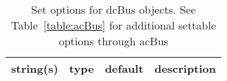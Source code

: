 \begin{table}[ht]
\centering
\begin{tabular}{p{5cm} c c p{7cm}}
\hline
string(s) & type & default & description \\
\hline
\hline
\end{tabular}
\caption{Set options for dcBus objects. See Table~\ref{table:acBus} for additional settable options through acBus}
\label{table:dcBus}
\end{table}

